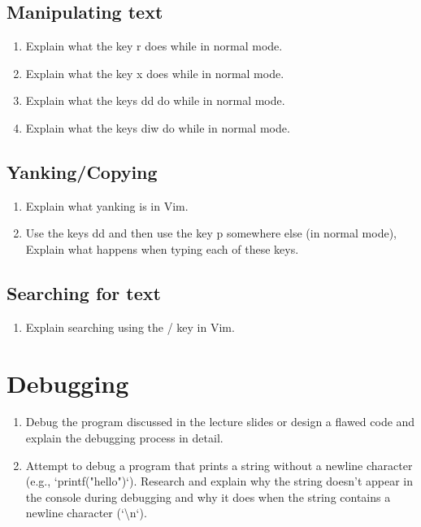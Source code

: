 \documentclass[titlepage]{article}
\begin{document}
\subsection{Manipulating text}
\begin{enumerate}
    \item Explain what the key r does while in normal mode.
    \item Explain what the key x does while in normal mode.
    \item Explain what the keys dd do while in normal mode.
    \item Explain what the keys diw do while in normal mode.
\end{enumerate}



\subsection{Yanking/Copying}
\begin{enumerate}
    \item Explain what yanking is in Vim.
    \item Use the keys dd and then use the key p somewhere else (in normal mode), Explain what
        happens when typing each of these keys.
\end{enumerate}

\subsection{Searching for text}
\begin{enumerate}
    \item Explain searching using the / key in Vim.
\end{enumerate}

\section{Debugging}
\begin{enumerate}
    \item Debug the program discussed in the lecture slides or design a flawed code and explain the debugging process in detail.
    \item Attempt to debug a program that prints a string without a newline character (e.g., `printf("hello")`).
        Research and explain why the string doesn't appear in the console during debugging 
        and why it does when the string contains a newline character (`\textbackslash n`).
\end{enumerate}
\end{document}

